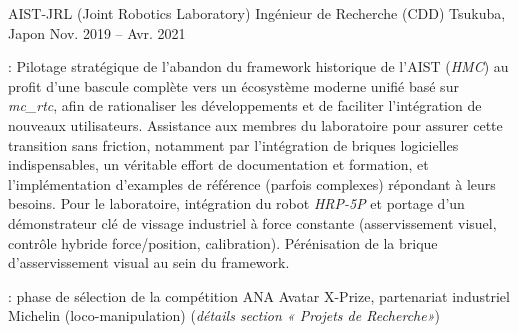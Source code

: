 \begin{cventries}
\cventry
    {AIST-JRL (Joint Robotics Laboratory)} %
    {Ingénieur de Recherche (CDD)} %
    {Tsukuba, Japon} %
    {Nov. 2019 -- Avr. 2021} %
    {
      \begin{cvitems} %
        \item {} : Pilotage stratégique de l'abandon du framework historique de l'AIST (\emph{HMC}) au profit d'une bascule complète vers un écosystème moderne unifié basé sur \emph{mc\_rtc}, afin de rationaliser les développements et de faciliter l'intégration de nouveaux utilisateurs. Assistance aux membres du laboratoire pour assurer cette transition sans friction, notamment par l'intégration de briques logicielles indispensables, un véritable effort de documentation et formation, et l'implémentation d'examples de référence (parfois complexes) répondant à leurs besoins. Pour le laboratoire, intégration du robot \emph{HRP-5P} et portage d'un démonstrateur clé de vissage industriel à force constante (asservissement visuel, contrôle hybride force/position, calibration). Pérénisation de la brique d'asservissement visual au sein du framework.
        \item {} : phase de sélection de la compétition ANA Avatar X-Prize, partenariat industriel Michelin (loco-manipulation) (\emph{détails section « Projets de Recherche»})
        \end{cvitems}
      }


\end{cventries}
